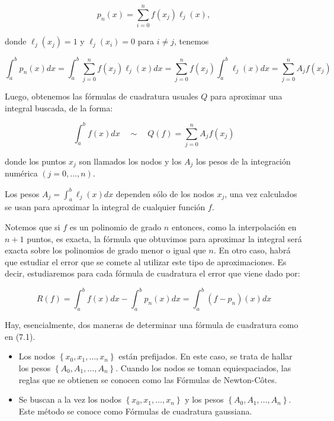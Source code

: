 \documentclass[10pt]{article}
\begin{document}
$$
p_{n}(x)=\sum_{i=0}^{n} f\left(x_{j}\right) \ell_{j}(x),
$$

donde $\ell_{j}\left(x_{j}\right)=1$ y $\ell_{j}\left(x_{i}\right)=0$ para $i \neq j$, tenemos

$$
\int_{a}^{b} p_{n}(x) d x=\int_{a}^{b} \sum_{j=0}^{n} f\left(x_{j}\right) \ell_{j}(x) d x=\sum_{j=0}^{n} f\left(x_{j}\right) \int_{a}^{b} \ell_{j}(x) d x=\sum_{j=0}^{n} A_{j} f\left(x_{j}\right)
$$

Luego, obtenemos las fórmulas de cuadratura usuales $Q$ para aproximar una integral buscada, de la forma:


\begin{equation*}
\int_{a}^{b} f(x) d x \quad \sim \quad Q(f)=\sum_{j=0}^{n} A_{j} f\left(x_{j}\right) \tag{7.1}
\end{equation*}


donde los puntos $x_{j}$ son llamados los nodos y los $A_{j}$ los pesos de la integración numérica $(j=0, \ldots, n)$.

Los pesos $A_{j}=\int_{a}^{b} \ell_{j}(x) d x$ dependen sólo de los nodos $x_{j}$, una vez calculados se usan para aproximar la integral de cualquier función $f$.

Notemos que si $f$ es un polinomio de grado $n$ entonces, como la interpolación en $n+1$ puntos, es exacta, la fórmula que obtuvimos para aproximar la integral será exacta sobre los polinomios de grado menor o igual que $n$. En otro caso, habrá que estudiar el error que se comete al utilizar este tipo de aproximaciones. Es decir, estudiaremos para cada fórmula de cuadratura el error que viene dado por:

$$
R(f)=\int_{a}^{b} f(x) d x-\int_{a}^{b} p_{n}(x) d x=\int_{a}^{b}\left(f-p_{n}\right)(x) d x
$$

Hay, esencialmente, dos maneras de determinar una fórmula de cuadratura como en (7.1).

\begin{itemize}
  \item Los nodos $\left\{x_{0}, x_{1}, \ldots, x_{n}\right\}$ están prefijados. En este caso, se trata de hallar los pesos $\left\{A_{0}, A_{1}, \ldots, A_{n}\right\}$. Cuando los nodos se toman equiespaciados, las reglas que se obtienen se conocen como las Fórmulas de Newton-Côtes.
  \item Se buscan a la vez los nodos $\left\{x_{0}, x_{1}, \ldots, x_{n}\right\}$ y los pesos $\left\{A_{0}, A_{1}, \ldots, A_{n}\right\}$. Este método se conoce como Fórmulas de cuadratura gaussiana.
\end{itemize}
\end{document}
